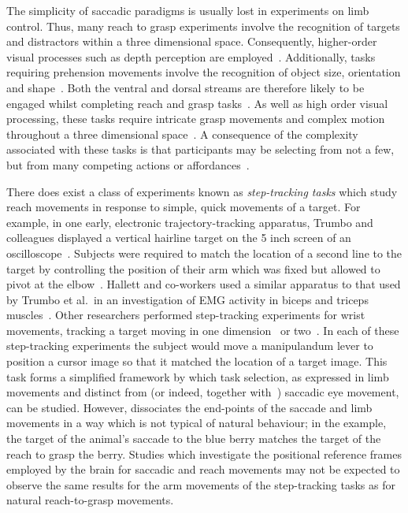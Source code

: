 \documentclass[10pt,letterpaper]{article}
\begin{document}
The simplicity of saccadic paradigms is usually lost in experiments on
limb control. Thus, many reach to grasp experiments involve the
recognition of targets and distractors within a three dimensional
space. Consequently, higher-order visual processes such as depth
perception are employed~\cite{welsh_movement_2004}. Additionally,
tasks requiring prehension movements involve the recognition of object
size, orientation and shape~\cite{meegan_visual_1999}. Both the
ventral and dorsal streams are therefore likely to be engaged whilst
completing reach and grasp tasks~\cite{milner_two_2008}. As well as
high order visual processing, these tasks require intricate grasp
movements and complex motion throughout a three dimensional
space~\cite{howard_hand_1997,tipper_selective_1997,
  tipper_actionbased_1998,castiello_mechanisms_1999,jackson_are_1995}. A
consequence of the complexity associated with these tasks is that
participants may be selecting from not a few, but from many competing
actions or affordances~\cite{cisek_cortical_2007}.

There does exist a class of experiments known as \emph{step-tracking
  tasks} which study reach movements in response to simple, quick
movements of a target. For example, in one early, electronic
trajectory-tracking apparatus, Trumbo and colleagues displayed a
vertical hairline target on the 5 inch screen of an
oscilloscope~\cite{trumbo_versatile_1963}. Subjects were required to
match the location of a second line to the target by controlling the
position of their arm which was fixed but allowed to pivot at the
elbow~\cite{trumbo_motor_1968}. Hallett and co-workers used a similar
apparatus to that used by Trumbo et al.~in an investigation of EMG
activity in biceps and triceps muscles~\cite{hallett_emg_1975}. Other
researchers performed step-tracking experiments for wrist movements,
tracking a target moving in one
dimension~\cite{waters_influence_1981,hoffman_step-tracking_1986} or
two~\cite{haruno_optimal_2005}. In each of these step-tracking
experiments the subject would move a manipulandum lever to position a
cursor image so that it matched the location of a target image. This
task forms a simplified framework by which task selection, as
expressed in limb movements and distinct from (or indeed, together
with~\cite{trumbo_motor_1968}) saccadic eye movement, can be
studied. However, dissociates the end-points of the saccade and
limb movements in a way which is not typical of natural behaviour; in
the example, the target of the animal's saccade to the blue berry
matches the target of the reach to grasp the berry. Studies which
investigate the positional reference frames employed by the brain for
saccadic and reach movements may not be expected to observe the same
results for the arm movements of the step-tracking tasks as for
natural reach-to-grasp movements.
\end{document}
